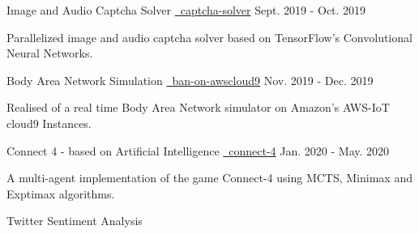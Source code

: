 \begin{cventries}
   \cvproject
    {Image and Audio Captcha Solver}
    {
    {}
    {\href{https://github.com/mukeshmk/image-audio-captcha}
    {\faGithubSquare\ captcha-solver}}
    }
    {Sept. 2019 - Oct. 2019}
    {
      \begin{cvitems}
      \vspace{-0.5ex}
        \item {Parallelized image and audio captcha solver based on TensorFlow’s Convolutional Neural Networks.}
      \end{cvitems}
    }
  \cvproject
    {Body Area Network Simulation}
    {
    {}
    {\href{https://github.com/mukeshmk/ban-on-awscloud9}{\faGithubSquare\ ban-on-awscloud9}}
    }
    {Nov. 2019 - Dec. 2019}
    {
       \begin{cvitems}
       \vspace{-0.5ex}
        \item{Realised of a real time Body Area Network simulator on Amazon's AWS-IoT cloud9 Instances.}
      \end{cvitems}
    }
  \cvproject
    {Connect 4 - based on Artificial Intelligence}
    {
    {}
    {\href{https://github.com/mukeshmk/connect-4}{\faGithubSquare\ connect-4}}
    }
    {Jan. 2020 - May. 2020}
    {
      \begin{cvitems}
      \vspace{-0.5ex}
        \item {A multi-agent implementation of the game Connect-4 using MCTS, Minimax and Exptimax algorithms.}
      \end{cvitems}
    }
  \cvproject
    {Twitter Sentiment Analysis}

\end{cventries}
